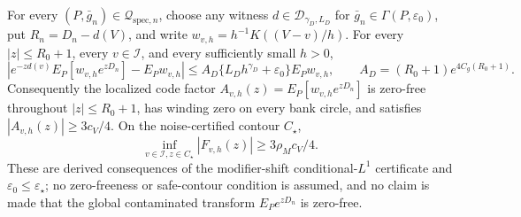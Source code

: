 For every \((P,\bar g_n)\in\mathcal Q_{\mathrm{spec},n}\), choose any witness \(d\in\mathcal D_{\gamma_D,L_D}\) for \(\bar g_n\in\Gamma(P,\varepsilon_0)\), put \(R_n=D_n-d(V)\), and write \(w_{v,h}=h^{-1}K((V-v)/h)\).  For every \(|z|\le R_0+1\), every \(v\in\mathcal I\), and every sufficiently small \(h>0\),
\[
 \left|e^{-zd(v)}E_P[w_{v,h}e^{zD_n}]-E_Pw_{v,h}\right|
 \le A_D\{L_Dh^{\gamma_D}+\varepsilon_0\}E_Pw_{v,h},
 \qquad A_D=(R_0+1)e^{4C_g(R_0+1)}.
\]
Consequently the localized code factor \(A_{v,h}(z)=E_P[w_{v,h}e^{zD_n}]\) is zero-free throughout \(|z|\le R_0+1\), has winding zero on every bank circle, and satisfies \(|A_{v,h}(z)|\ge3c_V/4\).  On the noise-certified contour \(C_\star\),
\[
 \inf_{v\in\mathcal I,z\in C_\star}|F_{v,h}(z)|
 \ge3\rho_Mc_V/4.
\]
These are derived consequences of the modifier-shift conditional-\(L^1\) certificate and \(\varepsilon_0\le\varepsilon_\star\); no zero-freeness or safe-contour condition is assumed, and no claim is made that the global contaminated transform \(E_Pe^{zD_n}\) is zero-free.